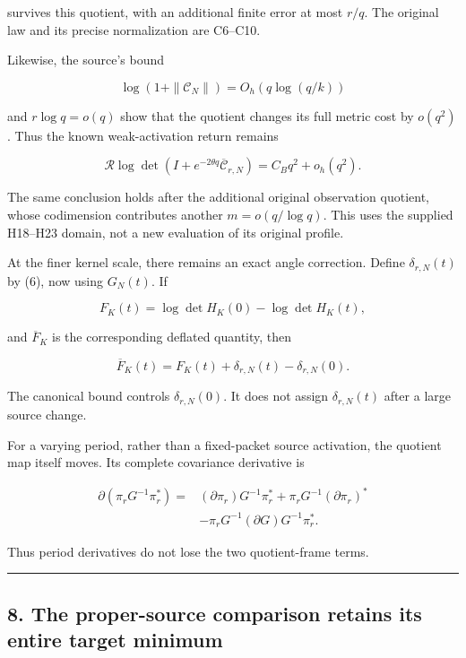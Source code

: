 \documentclass[11pt]{article}
\begin{document}
survives this quotient, with an additional finite error at most \(r/q\). The original law and its precise normalization are C6--C10.

Likewise, the source's bound

\[
\log(1+\|\mathcal C_N\|)
=
O_h(q\log(q/k))
\]

and \(r\log q=o(q)\) show that the quotient changes its full metric cost by \(o(q^2)\). Thus the known weak-activation return remains

\[
\boxed{
\mathcal R\log\det
(I+e^{-2\theta q}\overline{\mathcal C}_{r,N})
=
C_Bq^2+o_h(q^2).
}
\tag{48}
\]

The same conclusion holds after the additional original observation quotient, whose codimension contributes another \(m=o(q/\log q)\). This uses the supplied H18--H23 domain, not a new evaluation of its original profile.

At the finer kernel scale, there remains an exact angle correction. Define \(\delta_{r,N}(t)\) by (6), now using \(G_N(t)\). If

\[
F_K(t)=\log\det H_K(0)-\log\det H_K(t),
\]

and \(\overline F_K\) is the corresponding deflated quantity, then

\[
\boxed{
\overline F_K(t)
=
F_K(t)+\delta_{r,N}(t)-\delta_{r,N}(0).
}
\tag{49}
\]

The canonical bound controls \(\delta_{r,N}(0)\). It does not assign \(\delta_{r,N}(t)\) after a large source change.

For a varying period, rather than a fixed-packet source activation, the quotient map itself moves. Its complete covariance derivative is

\[
\boxed{
\begin{aligned}
\partial(\pi_rG^{-1}\pi_r^*)
={}&
(\partial\pi_r)G^{-1}\pi_r^*
+\pi_rG^{-1}(\partial\pi_r)^*\\
&-\pi_rG^{-1}(\partial G)G^{-1}\pi_r^*.
\end{aligned}
}
\tag{50}
\]

Thus period derivatives do not lose the two quotient-frame terms.

\begin{center}\rule{0.5\linewidth}{0.5pt}\end{center}

\subsection{8. The proper-source comparison retains its entire target minimum}\label{the-proper-source-comparison-retains-its-entire-target-minimum}
\end{document}
